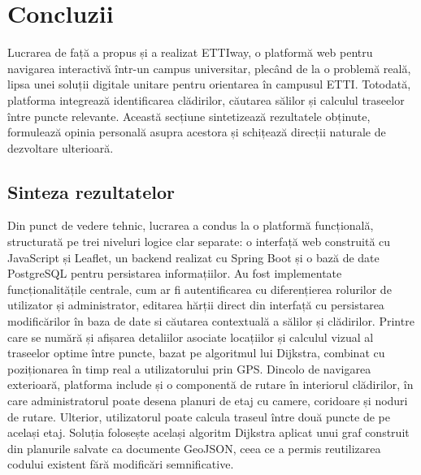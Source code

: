 
\chapter*{Concluzii}

Lucrarea de față a propus și a realizat ETTIway, o platformă web pentru
navigarea interactivă într-un campus universitar, plecând de la o problemă
reală, lipsa unei soluții digitale unitare pentru orientarea în campusul ETTI.
Totodată, platforma integrează identificarea clădirilor, căutarea sălilor și calculul
traseelor între puncte relevante. Această secțiune sintetizează rezultatele
obținute, formulează opinia personală asupra acestora și schițează direcții
naturale de dezvoltare ulterioară.

\section*{Sinteza rezultatelor}

Din punct de vedere tehnic, lucrarea a condus la o platformă funcțională,
structurată pe trei niveluri logice clar separate: o interfață web construită cu
JavaScript și Leaflet, un backend realizat cu Spring Boot și o bază de date
PostgreSQL pentru persistarea informațiilor. Au fost implementate
funcționalitățile centrale, cum ar fi autentificarea cu
diferențierea rolurilor de utilizator și administrator, editarea hărții direct
din interfață cu persistarea modificărilor în baza de date si căutarea contextuală
a sălilor și clădirilor. Printre care se numără și afișarea detaliilor asociate locațiilor și calculul
vizual al traseelor optime între puncte, bazat pe algoritmul lui Dijkstra,
combinat cu poziționarea în timp real a utilizatorului prin GPS. Dincolo de
navigarea exterioară, platforma include și o componentă de rutare în interiorul
clădirilor, în care administratorul poate desena planuri de etaj cu camere,
coridoare și noduri de rutare. Ulterior, utilizatorul poate calcula traseul între
două puncte de pe același etaj. Soluția folosește același algoritm Dijkstra
aplicat unui graf construit din planurile salvate ca documente GeoJSON, ceea
ce a permis reutilizarea codului existent fără modificări semnificative.

